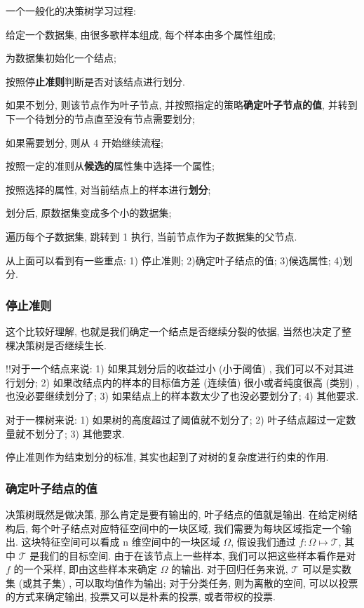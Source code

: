 一个一般化的决策树学习过程: 
\begin{myenumerate}
	\item 给定一个数据集, 由很多歌样本组成, 每个样本由多个属性组成; 
	\item 为数据集初始化一个结点; 
	\item 按照停\textbf{止准则}判断是否对该结点进行划分. 
	\item 如果不划分, 则该节点作为叶子节点, 并按照指定的策略\textbf{确定叶子节点的值}, 并转到下一个待划分的节点直至没有节点需要划分; 
	\item 如果需要划分, 则从 4 开始继续流程; 
	\item 按照一定的准则从\textbf{候选的}属性集中选择一个属性; 
	\item 按照选择的属性, 对当前结点上的样本进行\textbf{划分}; 
	\item 划分后, 原数据集变成多个小的数据集; 
	\item 遍历每个子数据集, 跳转到 1 执行, 当前节点作为子数据集的父节点. 
\end{myenumerate}


从上面可以看到有一些重点: 1) 停止准则; 2)确定叶子结点的值; 3)候选属性; 4)划分.

\subsubsection{停止准则}
这个比较好理解, 也就是我们确定一个结点是否继续分裂的依据, 当然也决定了整棵决策树是否继续生长. 

!!对于一个结点来说: 1) 如果其划分后的收益过小 (小于阈值) , 我们可以不对其进行划分; 2) 如果改结点内的样本的目标值方差 (连续值) 很小或者纯度很高 (类别) , 也没必要继续划分了; 3) 如果结点上的样本数太少了也没必要划分了; 4) 其他要求. 

对于一棵树来说: 1) 如果树的高度超过了阈值就不划分了; 2) 叶子结点超过一定数量就不划分了; 3) 其他要求.

停止准则作为结束划分的标准, 其实也起到了对树的复杂度进行约束的作用. 

\subsubsection{确定叶子结点的值}
决策树既然是做决策, 那么肯定是要有输出的, 叶子结点的值就是输出. 在给定树结构后, 每个叶子结点对应特征空间中的一块区域, 我们需要为每块区域指定一个输出. 这块特征空间可以看成 n 维空间中的一块区域 $\Omega$, 假设我们通过 $f: \Omega \longmapsto \mathcal{T}$, 其中 $\mathcal{T}$ 是我们的目标空间. 由于在该节点上一些样本, 我们可以把这些样本看作是对 $f$ 的一个采样, 即由这些样本来确定 $\Omega$ 的输出. 对于回归任务来说, $\mathcal{T}$ 可以是实数集 (或其子集) , 可以取均值作为输出; 对于分类任务, 则为离散的空间, 可以以投票的方式来确定输出, 投票又可以是朴素的投票, 或者带权的投票. 


